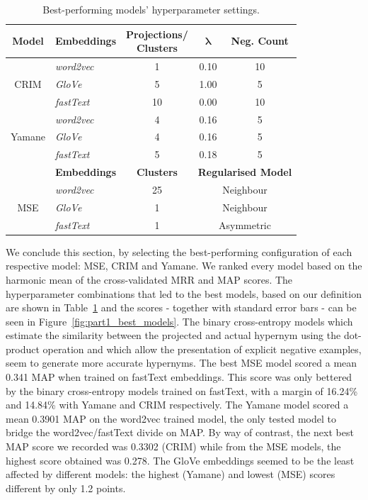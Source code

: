 \begin{table}\centering
    \begin{tabular}{@{}clccc@{}} \toprule
    \textbf{Model} & \textbf{Embeddings} & \shortstack{\textbf{Projections/}\\\textbf{Clusters}} & $\bm{\lambda}$ & \textbf{Neg. Count} \\ \midrule
    \multirow{3}{*}{CRIM} & \textit{word2vec} & 1 & 0.10 & 10 \\
    & \textit{GloVe} & 5 & 1.00 & 5\\
    & \textit{fastText} & 10 & 0.00 & 10\\ \cmidrule{2-5}
    \multirow{3}{*}{Yamane} & \textit{word2vec} & 4 & 0.16 & 5 \\
    & \textit{GloVe} & 4 & 0.16 & 5\\
    & \textit{fastText} & 5 & 0.18 & 5\\ \midrule
    & \textbf{Embeddings} & \textbf{Clusters} & \multicolumn{2}{c}{\textbf{Regularised Model}}\\ \cmidrule{2-5}
    \multirow{3}{*}{MSE} & \textit{word2vec} & 25 & \multicolumn{2}{c}{Neighbour} \\
    & \textit{GloVe} & 1 & \multicolumn{2}{c}{Neighbour} \\
    & \textit{fastText} & 1 & \multicolumn{2}{c}{Asymmetric} \\
    \bottomrule
    \end{tabular}
    \caption{Best-performing models' hyperparameter settings.}\label{tab:all_model_best_hyper}
\end{table}

We conclude this section, by selecting the best-performing configuration of each respective model: \ac{MSE}, CRIM and Yamane.  We ranked every model based on the harmonic mean of the cross-validated \ac{MRR} and \ac{MAP} scores.  The hyperparameter combinations that led to the best models, based on our definition are shown in Table~\ref{tab:all_model_best_hyper} and the scores - together with standard error bars - can be seen in Figure~\ref{fig:part1_best_models}.  The binary cross-entropy models which estimate the similarity between the projected and actual hypernym using the dot-product operation and which allow the presentation of explicit negative examples, seem to generate more accurate hypernyms.  The best \ac{MSE} model scored a mean 0.341 \ac{MAP} when trained on fastText embeddings.  This score was only bettered by the binary cross-entropy models trained on fastText, with a margin of 16.24\% and 14.84\% with Yamane and CRIM respectively.  The Yamane model scored a mean 0.3901 \ac{MAP} on the word2vec trained model, the only tested model to bridge the word2vec/fastText divide on \ac{MAP}.  By way of contrast, the next best \ac{MAP} score we recorded was 0.3302 (CRIM) while from the \ac{MSE} models, the highest score obtained was 0.278.  The GloVe embeddings seemed to be the least affected by different models: the highest (Yamane) and lowest (MSE) scores different by only 1.2 points.


